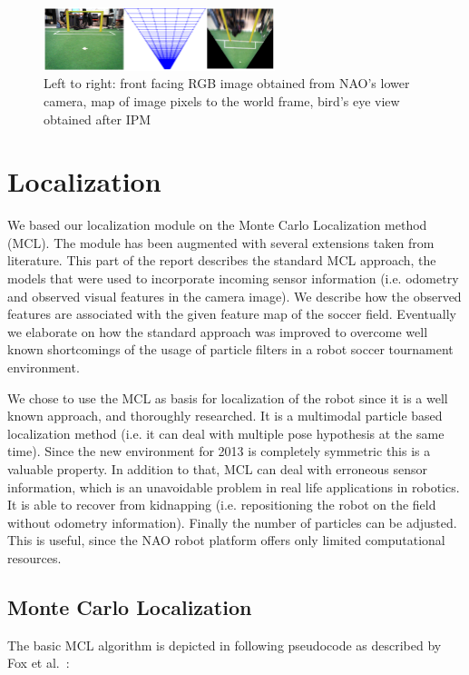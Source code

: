 \documentclass[	DIV=calc,%
							paper=a4,%
							fontsize=9pt,%
							twocolumn]{scrartcl}	 					%
\begin{document}
\begin{figure}
\caption{Left to right: front facing RGB image obtained from NAO's lower camera, map of image pixels to the world frame, bird's eye view obtained after IPM}
\label{fig:IPM}
\includegraphics[width = 255px]{figures/imagePixelsMapped.png}
\end{figure}


\section{Localization}
\label{sec:Localization}
We based our localization module on the Monte Carlo Localization method (MCL). The module has been augmented with several extensions taken from literature. This part of the report describes the standard MCL approach, the models that were used to incorporate incoming sensor information (i.e. odometry and observed visual features in the camera image). We describe how the observed features are associated with the given feature map of the soccer field. Eventually we elaborate on how the standard approach was improved to overcome well known shortcomings of the usage of particle filters in a robot soccer tournament environment.

We chose to use the MCL as basis for localization of the robot since it is a well known approach, and thoroughly researched. It is a multimodal particle based localization method (i.e. it can deal with multiple pose hypothesis at the same time). Since the new environment for 2013 is completely symmetric this is a valuable property. In addition to that, MCL can deal with erroneous sensor information, which is an unavoidable problem in real life applications in robotics. It is able to recover from kidnapping (i.e. repositioning the robot on the field without odometry information). Finally the number of particles can be adjusted. This is useful, since the NAO robot platform offers only limited computational resources.
\subsection{Monte Carlo Localization}
\label{sec:MCL}
The basic MCL algorithm is depicted in following pseudocode  as described by Fox et al.~\cite{MonteCarloLocalization}:\\
\end{document}
